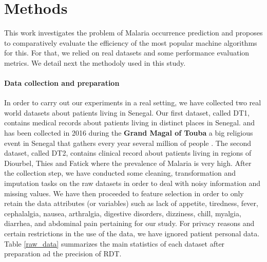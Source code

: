 \section{Methods}\label{Methods}
This work investigates the problem of Malaria occurrence prediction and proposes to comparatively evaluate the efficiency of the most popular machine algorithms for this. For that, we relied on real datasets and some performance evaluation metrics. We detail next the methodoly used in this study.

\paragraph*{Data collection and preparation}
In order to carry out  our experiments in a real setting, we have collected two real world datasets about patients living in Senegal. Our first dataset, called DT1, contains medical records about patients living in distinct places in Senegal. and has been collected in 2016 during the \textbf{Grand Magal of Touba}  a big religious event in Senegal that gathers every year several million of people \cite{Ch17}.   The second dataset, called DT2, contains clinical record about patients living in regions of Diourbel, Thies and Fatick where the prevalence of Malaria is very high. After the collection step, we have conducted some cleaning, transformation and imputation tasks on the raw datasets in order to deal with noisy information and missing values. We have then proceeded to feature selection in order to only retain the data attributes (or variables) such as lack of appetite, tiredness, fever, cephalalgia, nausea, arthralgia, digestive disorders, dizziness, chill, myalgia, diarrhea, and abdominal pain pertaining for our study.
For privacy reasons and certain restrictions in the use of the data, we have ignored patient personal data.
Table \ref{raw_data} summarizes the main statistics of each dataset after preparation ad the precision of RDT. 
\begin{table}[h]
  \caption{Raw Data characteristics}\label{raw_data}
\end{table}
